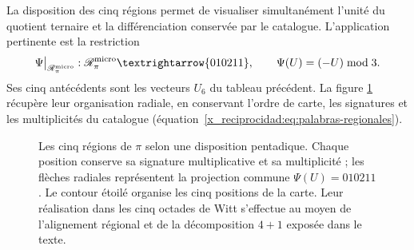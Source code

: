La disposition des cinq régions permet de visualiser simultanément
l'unité du quotient ternaire et la différenciation conservée par le
catalogue. L'application pertinente est la restriction
\[
 \Psi\big|_{\mathscr R_\pi^{\rm micro}}:
 \mathscr R_\pi^{\rm micro}\longrightarrow\{010211\},
 \qquad \Psi(U)=(-U)\bmod3.
\]
Ses cinq antécédents sont les vecteurs \(U_6\) du tableau précédent. La figure \ref{x_reciprocidad:pi-estrella:figura} récupère leur organisation radiale, en conservant l'ordre de carte, les signatures et les multiplicités du catalogue (équation~\eqref{x_reciprocidad:eq:palabras-regionales}).


\begin{figure}[H]
\centering
{}
\caption{Les cinq régions de \(\pi\) selon une disposition pentadique.
Chaque position conserve sa signature multiplicative et sa multiplicité ;
les flèches radiales représentent la projection commune
\(\Psi(U)=010211\). Le contour étoilé organise les cinq
positions de la carte. Leur réalisation dans les cinq octades de Witt
s'effectue au moyen de l'alignement régional et de la décomposition
\(4+1\) exposée dans le texte.}
\label{x_reciprocidad:pi-estrella:figura}
\end{figure}

